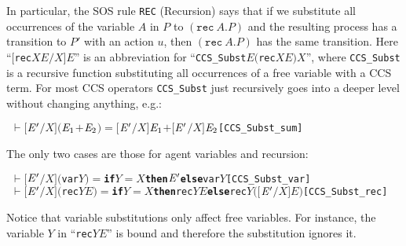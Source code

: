 \documentclass[GCNS]{yincog}
\renewcommand{\HOLinline}[1]{\mbox{\textup{\texttt{#1}}}}
\renewcommand{\HOLConst}[1]{\texttt{#1}}
\renewcommand{\HOLFreeVar}[1]{\ensuremath{\mathit{#1}}}
\renewcommand{\HOLKeyword}[1]{{\textbf{\textsf{#1}}}}
\renewcommand{\HOLSymConst}[1]{#1}
\renewcommand{\HOLTokenTurnstile}{\ensuremath{\:\:\vdash}}
\theoremstyle{remark}
\theoremstyle{theorem}
\theoremstyle{remark}
\newcommand{\recu}[2]{\mathtt{rec}\: #1 . #2}
\begin{document}
In particular, the SOS rule \texttt{REC} (Recursion) says that if we substitute
all occurrences of the variable $A$ in $P$ to $(\recu A P)$ and the resulting
process has a transition to $P'$ with an action $u$, then
$(\recu A P)$ has the same transition. Here ``\HOLinline{\ensuremath{[}\HOLConst{rec}\;\;\HOLFreeVar{X}\;\;\HOLFreeVar{E}\ensuremath{/}\HOLFreeVar{X}\ensuremath{]}\;\;\HOLFreeVar{E}}''
is an abbreviation for ``\HOLinline{\HOLConst{CCS\_Subst}\;\;\HOLFreeVar{E}\;\;\ensuremath{(}\HOLConst{rec}\;\;\HOLFreeVar{X}\;\;\HOLFreeVar{E}\ensuremath{)}\;\;\HOLFreeVar{X}}'',
where \HOLinline{\HOLConst{CCS\_Subst}} is a recursive function substituting
all occurrences of a free variable with a CCS term. For most CCS operators
\HOLinline{\HOLConst{CCS\_Subst}} just recursively goes into a deeper level
without changing anything, e.g.:
%
\begin{alltt}
\HOLTokenTurnstile{} \ensuremath{[}\ensuremath{\HOLFreeVar{E}\sp{\prime}}\ensuremath{/}\HOLFreeVar{X}\ensuremath{]} \ensuremath{(}\ensuremath{\HOLFreeVar{E}\sb{\mathrm{1}}} \HOLSymConst{\ensuremath{+}} \ensuremath{\HOLFreeVar{E}\sb{\mathrm{2}}}\ensuremath{)} \HOLSymConst{\ensuremath{=}} \ensuremath{[}\ensuremath{\HOLFreeVar{E}\sp{\prime}}\ensuremath{/}\HOLFreeVar{X}\ensuremath{]} \ensuremath{\HOLFreeVar{E}\sb{\mathrm{1}}} \HOLSymConst{\ensuremath{+}} \ensuremath{[}\ensuremath{\HOLFreeVar{E}\sp{\prime}}\ensuremath{/}\HOLFreeVar{X}\ensuremath{]} \ensuremath{\HOLFreeVar{E}\sb{\mathrm{2}}}\hfill{[CCS\_Subst\_sum]}
\end{alltt}
%
The only two  cases are those for agent variables and recursion:
%
\begin{alltt}
\HOLTokenTurnstile{} \ensuremath{[}\ensuremath{\HOLFreeVar{E}\sp{\prime}}\ensuremath{/}\HOLFreeVar{X}\ensuremath{]} \ensuremath{(}\HOLConst{var} \HOLFreeVar{Y}\ensuremath{)} \HOLSymConst{\ensuremath{=}} \HOLKeyword{if} \HOLFreeVar{Y} \HOLSymConst{\ensuremath{=}} \HOLFreeVar{X} \HOLKeyword{then} \ensuremath{\HOLFreeVar{E}\sp{\prime}} \HOLKeyword{else} \HOLConst{var} \HOLFreeVar{Y}\hfill{[CCS\_Subst\_var]}
\HOLTokenTurnstile{} \ensuremath{[}\ensuremath{\HOLFreeVar{E}\sp{\prime}}\ensuremath{/}\HOLFreeVar{X}\ensuremath{]} \ensuremath{(}\HOLConst{rec} \HOLFreeVar{Y} \HOLFreeVar{E}\ensuremath{)} \HOLSymConst{\ensuremath{=}} \HOLKeyword{if} \HOLFreeVar{Y} \HOLSymConst{\ensuremath{=}} \HOLFreeVar{X} \HOLKeyword{then} \HOLConst{rec} \HOLFreeVar{Y} \HOLFreeVar{E} \HOLKeyword{else} \HOLConst{rec} \HOLFreeVar{Y} \ensuremath{(}\ensuremath{[}\ensuremath{\HOLFreeVar{E}\sp{\prime}}\ensuremath{/}\HOLFreeVar{X}\ensuremath{]} \HOLFreeVar{E}\ensuremath{)}\hfill{[CCS\_Subst\_rec]}
\end{alltt}
%
Notice that variable substitutions only affect free variables. For instance,
the variable $Y$ in ``\HOLinline{\HOLConst{rec}\!\;\HOLFreeVar{Y}\!\;\HOLFreeVar{E}}''
is bound and therefore the substitution ignores it.
\end{document}

